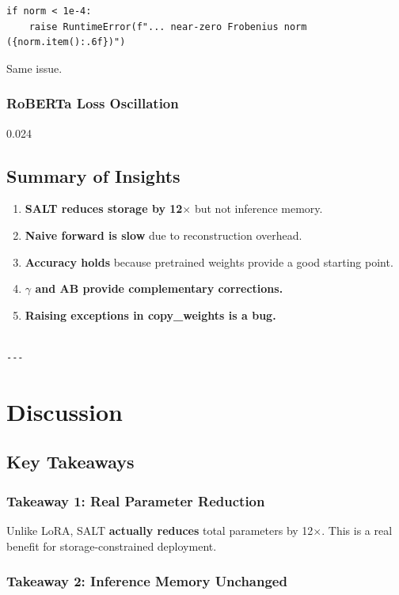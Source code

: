 \begin{lstlisting}
if norm < 1e-4:
    raise RuntimeError(f"... near-zero Frobenius norm ({norm.item():.6f})")
\end{lstlisting}

Same issue.

\subsubsection{RoBERTa Loss Oscillation}

0.024

\subsection{Summary of Insights}

\begin{enumerate}
\item \textbf{SALT reduces storage by 12$\times$} but not inference memory.
\item \textbf{Naive forward is slow} due to reconstruction overhead.
\item \textbf{Accuracy holds} because pretrained weights provide a good starting point.
\item \textbf{$\gamma$ and AB provide complementary corrections.}
\item \textbf{Raising exceptions in copy\_weights is a bug.}
\end{enumerate}
\begin{lstlisting}

---
\end{lstlisting}


\section{Discussion}

\subsection{Key Takeaways}

\subsubsection{Takeaway 1: Real Parameter Reduction}

Unlike LoRA, SALT \textbf{actually reduces} total parameters by 12$\times$. This is a 
real benefit for storage-constrained deployment.

\subsubsection{Takeaway 2: Inference Memory Unchanged}

